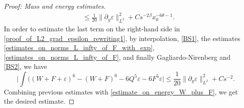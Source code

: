 \documentclass[16pt,english, oneside,reqno]{smfart}
\newcommand{\vare}{{\varepsilon}}
\begin{document}
\begin{proof}[Proof: Mass and energy estimates]
\begin{equation}
\begin{split}
    & \leq \frac{1}{20}\|\partial_y \vare \|^2_{L^2} + C s^{-2\beta}x^{-6\theta-1}_0.
\end{split}
\end{equation}
In order to estimate the last term on the right-hand side in \eqref{proof_of_L2_grad_epsilon_rewriting1}, by interpolation, \eqref{BS1}, the estimates \eqref{estimates_on_norms_L_infty_of_F_with_exp}, \eqref{estimates_on_norms_L_infty_of_F}, and finally Gagliardo-Nirenberg and \eqref{BS2}, we have
\begin{equation}
    \Big\lvert \int \Big((W+F+\vare)^6-(W+F)^6- 6Q^5\vare - 6F^5\vare \Big\lvert \leq \frac{1}{20}\|\partial_y \vare\|^2_{L^2} + Cs^{-2}.
\end{equation}
Combining previous estimates with \eqref{estimate_on_energy_W_plus_F}, we get the desired estimate.
\end{proof}
\end{document}
